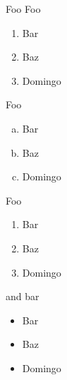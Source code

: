 \documentclass{beamer}
\begin{document}
\begin{frame}{Foo}
Foo
\begin{enumerate}
\item Bar
\item Baz
\item Domingo
\end{enumerate}

Foo
\begin{enumerate}[a.]
\item Bar
\item Baz
\item Domingo
\end{enumerate}

Foo
{
\begin{enumerate}
\item Bar
\item Baz
\item Domingo
\end{enumerate}
}

and bar

\begin{itemize}
\item Bar
\item Baz
\item Domingo
\end{itemize}
\end{frame}
\end{document}
